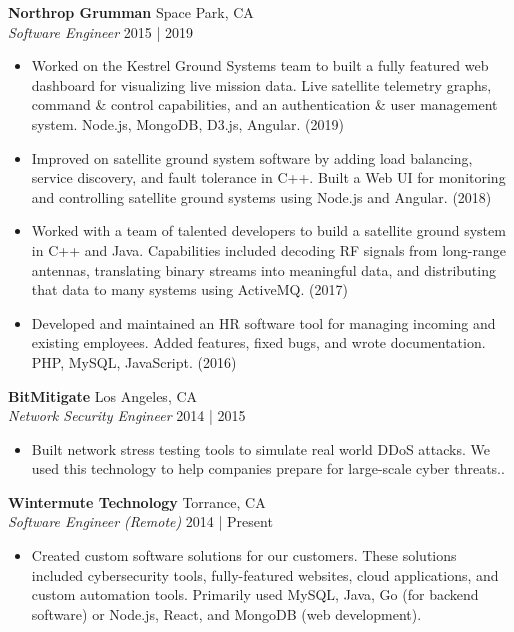\documentclass[a4paper]{article}
\begin{document}
\textbf{Northrop Grumman} \hfill Space Park, CA\\
\textit{Software Engineer} \hfill 2015 | 2019\\
\vspace{-1mm}
\begin{itemize} \itemsep 1pt
	\item Worked on the Kestrel Ground Systems team to built a fully featured web dashboard for visualizing live mission data. Live satellite telemetry graphs, command \& control capabilities, and an authentication \& user management system. Node.js, MongoDB, D3.js, Angular. (2019)
	\item Improved on satellite ground system software by adding load balancing, service discovery, and fault tolerance in C++. Built a Web UI for monitoring and controlling satellite ground systems using Node.js and Angular. (2018)
	\item Worked with a team of talented developers to build a satellite ground system in C++ and Java. Capabilities included decoding RF signals from long-range antennas, translating binary streams into meaningful data, and distributing that data to many systems using ActiveMQ. (2017)
	\item Developed and maintained an HR software tool for managing incoming and existing employees. Added features, fixed bugs, and wrote documentation. PHP, MySQL, JavaScript. (2016)
\end{itemize}
\textbf{BitMitigate} \hfill Los Angeles, CA\\
\textit{Network Security Engineer} \hfill 2014 | 2015\\
\vspace{-1mm}
\begin{itemize} \itemsep 1pt
	\item Built network stress testing tools to simulate real world DDoS attacks. We used this technology to help companies prepare for large-scale cyber threats..
\end{itemize}
\textbf{Wintermute Technology} \hfill Torrance, CA\\
\textit{Software Engineer (Remote)} \hfill 2014 | Present\\
\vspace{-1mm}
\begin{itemize} \itemsep 1pt
	\item Created custom software solutions for our customers. These solutions included cybersecurity tools, fully-featured websites, cloud applications, and custom automation tools. Primarily used MySQL, Java, Go (for backend software) or Node.js, React, and MongoDB (web development).
\end{itemize}
\end{document}
